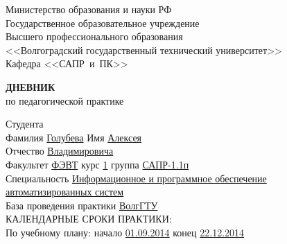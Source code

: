 \documentclass[a4paper, 14pt]{extreport}
\begin{document}
    \begin{titlepage}
        \begin{center}
            Министерство образования и науки РФ \\
            Государственное образовательное учреждение\\
            Высшего профессионального образования\\
            <<Волгоградский государственный технический университет>>\\
            Кафедра <<САПР~и~ПК>>
        \end{center}
        \vspace{2cm}
        \begin{center}
            \large \textbf{ДНЕВНИК} \\
            по педагогической практике
        \end{center}
        \begin{flushleft}
            Студента\\
            Фамилия \underline{Голубева\hspace{3.1cm}} 
            Имя \underline{Алексея\hspace{2.1cm}}\\
            Отчество \underline{Владимировича\hspace{1.6cm}}\\
            Факультет \underline{ФЭВТ\hspace{3.45cm}} курс \underline{1\hspace{1.5cm}} 
            группа \underline{САПР-1.1п\hspace{1.9cm}}\\
            \vspace{1cm}
            Специальность \underline{Информационное и программное обеспечение\hspace{2.7cm}}\\
            \underline{автоматизированных систем\hspace{10.15cm}}\\
            База проведения практики \underline{ВолгГТУ\hspace{8.4cm}}\\
            \vspace{1cm}
            КАЛЕНДАРНЫЕ СРОКИ ПРАКТИКИ:\\
            По учебному плану: \hspace{0.2cm} начало \underline{01.09.2014\hspace{1.8cm}} 
            конец \underline{22.12.2014\hspace{1.8cm}}\\

\end{flushleft}
\end{titlepage}
\end{document}
